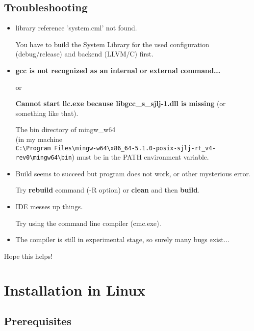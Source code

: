 \documentclass[oneside, a4paper, 11pt]{article}
\begin{document}
\subsection{Troubleshooting}

\begin{itemize}

\item
library reference 'system.cml' not found.

You have to build the System Library for the used configuration (debug/release) and backend (LLVM/C) first.

\item

\textbf{gcc is not recognized as an internal or external command...}

or

\textbf{Cannot start llc.exe because libgcc\_s\_sjlj-1.dll is missing} (or something like that).

The bin directory of mingw\_w64\\
(in my machine\\
\verb|C:\Program Files\mingw-w64\x86_64-5.1.0-posix-sjlj-rt_v4-rev0\mingw64\bin|)
must be in the PATH environment variable.

\item
Build seems to succeed but program does not work, or other mysterious error.

Try \textbf{rebuild} command (-R option) or \textbf{clean} and then \textbf{build}.

\item
IDE messes up things.

Try using the command line compiler (cmc.exe).

\item
The compiler is still in experimental stage, so surely many bugs exist...

\end{itemize}

Hope this helps!

\section{Installation in Linux}

\subsection{Prerequisites}
\end{document}
